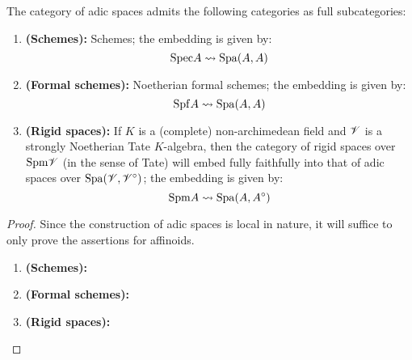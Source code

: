             \begin{theorem} \label{theorem: schemes_formal_schemes_rigid_spaces_and_adic_spaces}
                The category of adic spaces admits the following categories as full subcategories:
                    \begin{enumerate}
                        \item \textbf{(Schemes):} Schemes; the embedding is given by:
                            $$\mathrm{Spec} A \leadsto \mathrm{Spa}(A, A)$$
                        \item \textbf{(Formal schemes):} Noetherian formal schemes; the embedding is given by:
                            $$\mathrm{Spf} A \leadsto \mathrm{Spa}(A, A)$$
                        \item \textbf{(Rigid spaces):} If $K$ is a (complete) non-archimedean field and $\mathscr{V}$ is a strongly Noetherian Tate $K$-algebra, then the category of rigid spaces over $\mathrm{Spm} \mathscr{V}$ (in the sense of Tate) will embed fully faithfully into that of adic spaces over $\mathrm{Spa}(\mathscr{V}, \mathscr{V}^{\circ})$; the embedding is given by:
                            $$\mathrm{Spm} A \leadsto \mathrm{Spa}(A, A^{\circ})$$
                    \end{enumerate}
            \end{theorem}
                \begin{proof}
                    Since the construction of adic spaces is local in nature, it will suffice to only prove the assertions for affinoids.
                    \begin{enumerate}
                        \item \textbf{(Schemes):}
                        \item \textbf{(Formal schemes):}
                        \item \textbf{(Rigid spaces):}
                    \end{enumerate}
                \end{proof}
        
